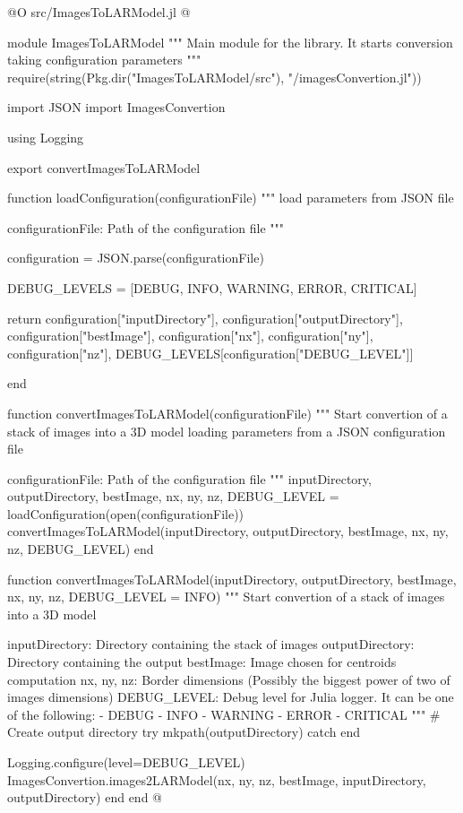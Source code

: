 \documentclass[11pt,oneside]{article}	%
\begin{document}
@O src/ImagesToLARModel.jl
@{module ImagesToLARModel
"""
Main module for the library. It starts conversion
taking configuration parameters
"""
require(string(Pkg.dir("ImagesToLARModel/src"), "/imagesConvertion.jl"))

import JSON
import ImagesConvertion

using Logging

export convertImagesToLARModel

function loadConfiguration(configurationFile)
  """
  load parameters from JSON file
  
  configurationFile: Path of the configuration file
  """

  configuration = JSON.parse(configurationFile)
  
  DEBUG_LEVELS = [DEBUG, INFO, WARNING, ERROR, CRITICAL]

  return configuration["inputDirectory"], configuration["outputDirectory"], configuration["bestImage"],
        configuration["nx"], configuration["ny"], configuration["nz"],
        DEBUG_LEVELS[configuration["DEBUG_LEVEL"]]

end

function convertImagesToLARModel(configurationFile)
  """
  Start convertion of a stack of images into a 3D model
  loading parameters from a JSON configuration file
  
  configurationFile: Path of the configuration file
  """
  inputDirectory, outputDirectory, bestImage, nx, ny, nz, DEBUG_LEVEL = loadConfiguration(open(configurationFile))
  convertImagesToLARModel(inputDirectory, outputDirectory, bestImage, nx, ny, nz, DEBUG_LEVEL)
end

function convertImagesToLARModel(inputDirectory, outputDirectory, bestImage,
                                 nx, ny, nz, DEBUG_LEVEL = INFO)
  """
  Start convertion of a stack of images into a 3D model
  
  inputDirectory: Directory containing the stack of images
  outputDirectory: Directory containing the output
  bestImage: Image chosen for centroids computation
  nx, ny, nz: Border dimensions (Possibly the biggest power of two of images dimensions)
  DEBUG_LEVEL: Debug level for Julia logger. It can be one of the following:
    - DEBUG
    - INFO
    - WARNING
    - ERROR
    - CRITICAL
  """
  # Create output directory
  try
    mkpath(outputDirectory)
  catch
  end

  Logging.configure(level=DEBUG_LEVEL)
  ImagesConvertion.images2LARModel(nx, ny, nz, bestImage, inputDirectory, outputDirectory)
end
end
@}
\end{document}
